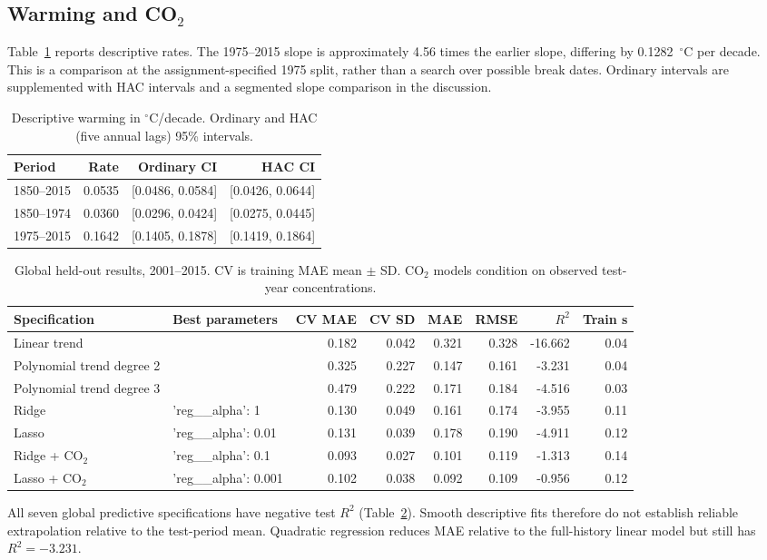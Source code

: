 \documentclass[conference]{IEEEtran}
\begin{document}
\subsection{Warming and \texorpdfstring{CO$_2$}{CO2}}
Table~\ref{tab:slopes} reports descriptive rates. The 1975--2015 slope is approximately 4.56 times the earlier slope, differing by 0.1282~$^\circ$C per decade. This is a comparison at the assignment-specified 1975 split, rather than a search over possible break dates. Ordinary intervals are supplemented with HAC intervals and a segmented slope comparison in the discussion.
\begin{table}[!tbp]
\caption{Descriptive warming in $^\circ$C/decade. Ordinary and HAC (five annual lags) 95\% intervals.}\label{tab:slopes}\centering\scriptsize
\begin{tabular}{lrrr}
\toprule Period & Rate & Ordinary CI & HAC CI \\\midrule
1850--2015 & 0.0535 & [0.0486, 0.0584] & [0.0426, 0.0644] \\
1850--1974 & 0.0360 & [0.0296, 0.0424] & [0.0275, 0.0445] \\
1975--2015 & 0.1642 & [0.1405, 0.1878] & [0.1419, 0.1864] \\
\bottomrule
\end{tabular}\end{table}
\begin{table}[!tbp]
\caption{Global held-out results, 2001--2015. CV is training MAE mean $\pm$ SD. CO$_2$ models condition on observed test-year concentrations.}\label{tab:globalmodels}\centering\scriptsize
\begin{tabular}{llrrrrrr}
\toprule Specification & Best parameters & CV MAE & CV SD & MAE & RMSE & $R^2$ & Train s \\\midrule
Linear trend & {} & 0.182 & 0.042 & 0.321 & 0.328 & -16.662 & 0.04 \\
Polynomial trend degree 2 & {} & 0.325 & 0.227 & 0.147 & 0.161 & -3.231 & 0.04 \\
Polynomial trend degree 3 & {} & 0.479 & 0.222 & 0.171 & 0.184 & -4.516 & 0.03 \\
Ridge & {'reg\_\_alpha': 1} & 0.130 & 0.049 & 0.161 & 0.174 & -3.955 & 0.11 \\
Lasso & {'reg\_\_alpha': 0.01} & 0.131 & 0.039 & 0.178 & 0.190 & -4.911 & 0.12 \\
Ridge + CO$_2$ & {'reg\_\_alpha': 0.1} & 0.093 & 0.027 & 0.101 & 0.119 & -1.313 & 0.14 \\
Lasso + CO$_2$ & {'reg\_\_alpha': 0.001} & 0.102 & 0.038 & 0.092 & 0.109 & -0.956 & 0.12 \\
\bottomrule
\end{tabular}\end{table}
All seven global predictive specifications have negative test $R^2$ (Table~\ref{tab:globalmodels}). Smooth descriptive fits therefore do not establish reliable extrapolation relative to the test-period mean. Quadratic regression reduces MAE relative to the full-history linear model but still has $R^2=-3.231$.
\end{document}
